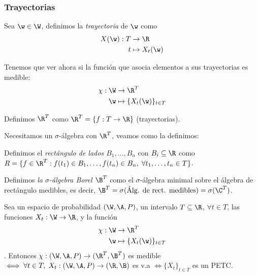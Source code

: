 \subsubsection{Trayectorias}

\begin{ndef}
  Sea $\w \in \W$, definimos la \emph{trayectoria} de $\w$ como
  \begin{align*}
    X(\w) : T & \to \R \\
    t & \mapsto X_t(\w)
  \end{align*}
\end{ndef}

Tenemos que ver ahora si la función que asocia elementos a sus trayectorias es medible:
\begin{align*}
  \chi : \W & \to \R^T \\
  \w & \mapsto \{ X_t(\w) \}_{t \in T}
\end{align*}

\begin{ndef}[$\R^T$]
  Definimos \emph{$\R^T$} como $\R^T = \{ f : T \to \R \}$ (trayectorias).
\end{ndef}

Necesitamos un $\sigma$-álgebra con $\R^T$, veamos como la definimos:

\begin{ndef}[Rectángulo en $\R^T$]
  Definimos el \emph{rectángulo de lados $B_1, \ldots, B_n$} con $B_i \subseteq \R$ como $R = \{ f \in \R^T : f(t_1) \in B_1, \ldots, f(t_n) \in B_n, \; \forall t_1, \ldots, t_n \in T \}$.
\end{ndef}


\begin{ndef}
  Definimos \emph{la $\sigma$-álgebra Borel $\B^T$} como el $\sigma$-álgebra minimal sobre el álgebra de rectángulo medibles, es decir, $\B^T = \sigma(\text{Álg. de rect. medibles}) = \sigma(\C^T)$.
\end{ndef}

\begin{ndef}
  Sea un espacio de probabilidad $(\W, \A, P)$, un intervalo $T \subseteq \R$, $\forall t \in T$, las funciones $X_t : \W \to \R$, y la función
  \begin{align*}
    \chi : \W & \to \R^T \\
    \w & \mapsto \{X_t(\w)\}_{t \in T}
  \end{align*}.
  Entonces $\chi : (\W, \A, P) \to (\R^T, \B^T)$ es medible $\iff \forall t \in T, \; X_t : (\W, \A, P) \to (\R, \B)$ es v.a $\iff \{X_t\}_{t \in T}$ es un PETC.
\end{ndef}

